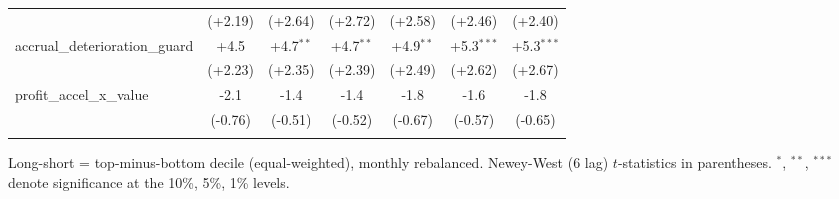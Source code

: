 \begin{table}[htbp]
\begin{threeparttable}
\begin{tabular}{lcccccc}
 & (+2.19) & (+2.64) & (+2.72) & (+2.58) & (+2.46) & (+2.40) \\
\addlinespace
accrual\_deterioration\_guard & +4.5 & +4.7$^{**}$ & +4.7$^{**}$ & +4.9$^{**}$ & +5.3$^{***}$ & +5.3$^{***}$ \\
 & (+2.23) & (+2.35) & (+2.39) & (+2.49) & (+2.62) & (+2.67) \\
\addlinespace
profit\_accel\_x\_value & -2.1 & -1.4 & -1.4 & -1.8 & -1.6 & -1.8 \\
 & (-0.76) & (-0.51) & (-0.52) & (-0.67) & (-0.57) & (-0.65) \\
\addlinespace
\bottomrule
\end{tabular}
\begin{tablenotes}\footnotesize
\item Long-short = top-minus-bottom decile (equal-weighted), monthly rebalanced. Newey-West (6 lag) $t$-statistics in parentheses. $^{*}$, $^{**}$, $^{***}$ denote significance at the 10\%, 5\%, 1\% levels.
\end{tablenotes}
\end{threeparttable}
\end{table}